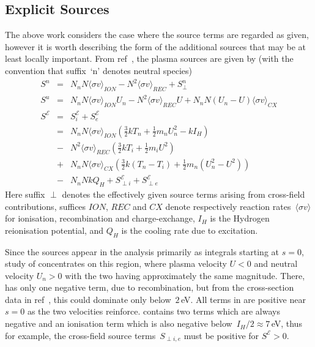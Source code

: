 \subsection{Explicit Sources}\label{sec:sources}
The above work considers the case where the source terms are regarded
as given, however it is worth describing the form of the additional sources that
may be at least locally important.
From ref~\cite{Ha13Benc}, the plasma sources are given by (with the convention that suffix~`n'
denotes neutral species)
\begin{eqnarray}
\label{eq:Sn} S^n&=&N_n N \langle\sigma v\rangle_{ION} - N^2 \langle\sigma v\rangle_{REC} +S^n_{\perp} \\
\label{eq:Su} S^u&=&N_n N \langle\sigma v\rangle_{ION} U_n - N^2 \langle\sigma v\rangle_{REC} U + N_n N (U_n-U) \langle\sigma v\rangle_{CX} \\
\label{eq:SE} S^\mathcal{E}&=&S^\mathcal{E}_i+S^\mathcal{E}_e \\
&=&N_n N \langle\sigma v\rangle_{ION} (\frac{3}{2} kT_n + \frac{1}{2} m_n U_n^2 -k I_H)\\
\nonumber &-& N^2 \langle\sigma v\rangle_{REC} (\frac{3}{2} kT_i + \frac{1}{2} m_i U^2 )\\
\nonumber &+&N_n N\langle\sigma v\rangle_{CX} \left(\frac{3}{2} k (T_n-T_i)  + \frac{1}{2} m_n (U_n^2-U^2)\right)\\
\nonumber &-&N_n N k Q_H +S^\mathcal{E}_{\perp i} +S^\mathcal{E}_{\perp e}
 \end{eqnarray}
Here suffix $\perp$ denotes the effectively given source terms arising from cross-field
contributions, suffices $ION$,
$REC$ and $CX$ denote respectively reaction rates~$\langle\sigma v\rangle$ for ionisation,
recombination and charge-exchange, $I_H$ is the Hydrogen reionisation potential,
and $Q_H$ is the cooling rate due to excitation. 

Since the sources appear in the analysis primarily as integrals starting at $s=0$,
study of  concentrates on this region, where plasma velocity $U<0$ and neutral velocity $U_n>0$
with the two having approximately the same magnitude. There,  has only one negative
term, due to recombination, but from the cross-section data in ref~\cite{Ha13Benc}, this could
dominate only below~$2$\,eV. All terms in  are positive near $s=0$ as the two velocities
reinforce.  contains two terms which are always negative and an ionisation
term which is also negative below~$I_H/2\approx7$\,eV, thus for example, the cross-field source
terms~$S_{\perp i,e}$  must be positive for $S^\mathcal{E}>0$.

